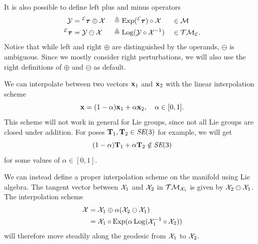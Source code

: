 It is also possible to define left plus and minus operators
\begin{alignat}{3}
  \mathcal{Y} &= \prescript{\mathcal{E}}{}{{\boldsymbol{\mathbf{\tau}}}} \oplus \mathcal{X} &&\triangleq \operatorname*{Exp}(\prescript{\mathcal{E}}{}{{\boldsymbol{\mathbf{\tau}}}}) \circ \mathcal{X} &&\in \mathcal{M}\\
  \prescript{\mathcal{E}}{}{{\boldsymbol{\mathbf{\tau}}}} &= \mathcal{Y} \ominus \mathcal{X} &&\triangleq \operatorname*{Log}(\mathcal{Y} \circ \mathcal{X}^{-1}) &&\in \mathcal{T}\mathcal{M}_{\mathcal{E}}.
\end{alignat}
Notice that while left and right $\oplus$ are distinguished by the operands, $\ominus$ is ambiguous.
Since we mostly consider right perturbations, we will also use the right definitions of $\oplus$ and $\ominus$ as default.

\begin{example}[frametitle=Interpolation on the manifold]
We can interpolate between two vectors ${\boldsymbol{\mathbf{x}}}_1$ and ${\boldsymbol{\mathbf{x}}}_2$ with the linear interpolation scheme
\begin{equation} \label{eq:vec-interp-example}
  {\boldsymbol{\mathbf{x}}} = (1-\alpha) {\boldsymbol{\mathbf{x}}}_1 + \alpha {\boldsymbol{\mathbf{x}}}_2, \quad \alpha \in [0,1].
\end{equation}
This scheme will not work in general for Lie groups, since not all Lie groups are closed under addition.
For poses ${\boldsymbol{\mathbf{T}}}_1, {\boldsymbol{\mathbf{T}}}_2 \in \textit{SE}(3)$ for example, we will get
\begin{equation}
  (1-\alpha) {\boldsymbol{\mathbf{T}}}_1 + \alpha {\boldsymbol{\mathbf{T}}}_2 \notin \textit{SE}(3)
\end{equation}
for some values of $\alpha \in [0,1]$.

We can instead define a proper interpolation scheme on the manifold using Lie algebra.
The tangent vector between $\mathcal{X}_1$ and $\mathcal{X}_2$ in $\mathcal{T}\mathcal{M}_{\mathcal{X}_1}$ is given by $\mathcal{X}_2 \ominus \mathcal{X}_1$.
The interpolation scheme
\begin{subequations}
\begin{align}
  \mathcal{X} &= \mathcal{X}_1 \oplus \alpha(\mathcal{X}_2 \ominus \mathcal{X}_1)\\
  &= \mathcal{X}_1 \circ \operatorname*{Exp}(\alpha \operatorname*{Log}(\mathcal{X}_1^{-1} \circ \mathcal{X}_2))
\end{align}
\end{subequations}
will therefore move steadily along the geodesic from $\mathcal{X}_1$ to $\mathcal{X}_2$.


\end{example}
